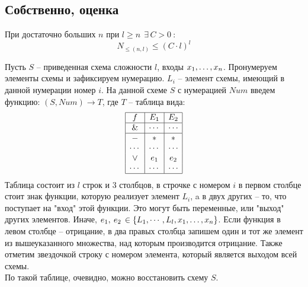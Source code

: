 \subsection{Собственно, оценка}
\begin{lemma}
При достаточно больших $n$ при $l\geq n \:\: \exists \, C>0 \: : $\\
$$N_{\leq(n,l)}\leq (C\cdot l)^l $$
\end{lemma}
Пусть $S$ -- приведенная схема сложности $l$, входы $x_1, \ldots, x_n$.
Пронумеруем элементы схемы и зафиксируем нумерацию. $L_i$ -- элемент схемы, имеющий в данной нумерации номер $i$. На данной схеме $S$ с нумерацией $Num$ введем функцию:
$(S,Num)\rightarrow T$, где $T$ -- таблица вида:
$$
    \begin{array}{|c|c|c|}
    \hline
    f & E_1 & E_2 \\
    \hline
    \& & \cdots &  \cdots \\
    \hline
     - & * & * \\
     \cdots & \cdots & \cdots \\
    \vee & e_1 & e_2 \\
     \cdots & \cdots & \cdots \\
    \hline
    \end{array}
    $$
Таблица состоит из $l$ строк и $3$ столбцов, в строчке с номером $i$ в первом столбце стоит знак функции, которую реализует элемент $L_i$, a в двух других -- то, что поступает на "вход"  этой функции. Это могут быть переменные, или "выход"  других элементов. Иначе, $e_1, \:e_2\, \in \{ L_1, \cdots ,L_l, x_1, \ldots, x_n\} $. Если функция в левом столбце -- отрицание, в два правых столбца запишем один и тот же элемент из вышеуказанного множества, над которым производится отрицание. Также отметим звездочкой строку с номером элемента, который является выходом всей схемы. \\
По такой таблице, очевидно, можно восстановить схему $S$.
